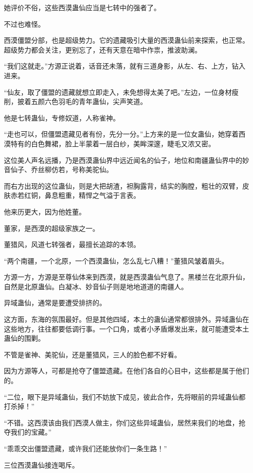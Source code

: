 \begin{this_body}
她评价不俗，这些西漠蛊仙应当是七转中的强者了。

不过也难怪。

西漠僵盟分部，也是超级势力。它的遗藏吸引大量的西漠蛊仙前来探索，也正常。超级势力都会关注，更别忘了，还有天意在暗中作祟，推波助澜。

“我们这就走。”方源正说着，话音还未落，就有三道身影，从左、右、上方，钻入进来。

“仙友，取了僵盟的遗藏就想立即走入，未免想得太美了吧。”左边，一位身材瘦削，披着五颜六色羽毛的青年蛊仙，尖声笑道。

他是七转蛊仙，专修奴道，人称雀神。

“走也可以，但僵盟遗藏见者有份，先分一分。”上方来的是一位女蛊仙，她穿着西漠特有的白色舞裙，脸上半蒙着一层白纱，美眸深邃，睫毛又浓又密。

这位美人声名远播，乃是西漠蛊仙界中远近闻名的仙子，地位和南疆蛊仙界中的妙音仙子、乔丝柳仿若，号称美驼仙。

而右方出现的这位蛊仙，则是大把胡渣，袒胸露背，结实的胸膛，粗壮的双臂，皮肤赤若红铜，鼻息粗重，精悍之气溢于言表。

他来历更大，因为他姓董。

董家，是西漠的超级家族之一。

董猎风，风道七转强者，最擅长追踪的本领。

“两个南疆，一个北原，一个西漠蛊仙，怎么乱七八糟！”董猎风皱着眉头。

方源一方，方源是至尊仙体来到西漠，就是西漠蛊仙气息了。黑楼兰在北原升仙，自然是北原蛊仙。白凝冰、妙音仙子则是地地道道的南疆人。

异域蛊仙，通常是要遭受排挤的。

这方面，东海的氛围最好。但是其他四域，本土的蛊仙通常都很排外。异域蛊仙在这些地方，往往都要低调行事。一个口角，或者小矛盾爆发出来，就可能遭受本土蛊仙的围剿。

不管是雀神、美驼仙，还是董猎风，三人的脸色都不好看。

因为方源等人，可都是抢夺了僵盟遗藏。在他们各自的心目中，这些都是属于他们的。

“二位，眼下是异域蛊仙，我们不妨放下成见，彼此合作，先将眼前的异域蛊仙都打杀掉！”

“不错。这西漠该由我们西漠人做主，你们这些异域蛊仙，居然来我们的地盘，抢夺我们的宝藏。”

“乖乖交出僵盟遗藏，或许我们还能放你们一条生路！”

三位西漠蛊仙接连喝斥。


\end{this_body}
